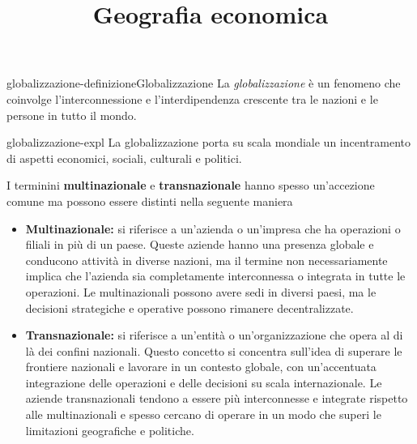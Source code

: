 \documentclass[preview]{standalone}
\begin{document}
\title{Geografia economica}
\genpage

\begin{snippetdefinition}{globalizzazione-definizione}{Globalizzazione}
    La \textit{globalizzazione} è un fenomeno che coinvolge l'interconnessione e l'interdipendenza crescente tra le nazioni e le persone in tutto il mondo.
\end{snippetdefinition}

\begin{snippet}{globalizzazione-expl}
    La globalizzazione porta su scala mondiale un incentramento di aspetti economici, sociali, culturali e politici.

    I terminini \textbf{multinazionale} e \textbf{transnazionale} hanno spesso
    un'accezione comune ma possono essere distinti nella seguente maniera
    \begin{itemize}
        \item \textbf{Multinazionale:} si riferisce a un'azienda o un'impresa che
            ha operazioni o filiali in più di un paese.
            Queste aziende hanno una presenza globale e conducono attività in diverse nazioni,
            ma il termine non necessariamente implica che l'azienda sia completamente interconnessa
            o integrata in tutte le operazioni.
            Le multinazionali possono avere sedi in diversi paesi,
            ma le decisioni strategiche e operative possono rimanere decentralizzate.
            \item \textbf{Transnazionale:} si riferisce a un'entità o un'organizzazione che opera
            al di là dei confini nazionali.
            Questo concetto si concentra sull'idea di superare le frontiere nazionali
            e lavorare in un contesto globale,
            con un'accentuata integrazione delle operazioni e delle decisioni su scala internazionale.
            Le aziende transnazionali tendono a essere più interconnesse e
            integrate rispetto alle multinazionali e spesso cercano di operare
            in un modo che superi le limitazioni geografiche e politiche.
    \end{itemize}
\end{snippet}
\end{document}
